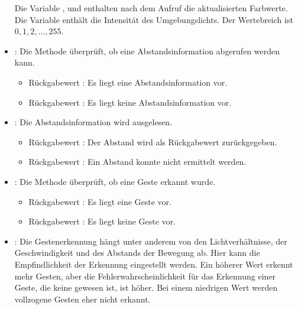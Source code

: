 \begin{itemize}


        \medskip

        Die Variable ,  und   enthalten nach dem Aufruf die aktualisierten Farbwerte. Die Variable enthält die Intensität des Umgebungslichts. Der Wertebreich ist $0, 1, 2, \ldots, 255$.
  
  \item {}: Die Methode überprüft, ob eine Abstandsinformation abgerufen werden kann.

        \medskip

        \begin{itemize}
          \item Rückgabewert : Es liegt eine Abstandsinformation vor.
          \item Rückgabewert : Es liegt keine Abstandsinformation vor.
       \end{itemize}

  \item {}: Die Abstandsinformation wird ausgelesen.
  
        \medskip

        \begin{itemize}
          \item Rückgabewert : Der Abstand wird als Rückgabewert zurückgegeben.
          \item Rückgabewert : Ein Abstand konnte nicht ermittelt werden.
       \end{itemize}
   
  \item {}: Die Methode überprüft, ob eine Geste erkannt wurde.

        \medskip

        \begin{itemize}
          \item Rückgabewert : Es liegt eine Geste vor.
          \item Rückgabewert : Es liegt keine Geste vor.
       \end{itemize}

  \item {}: Die Gestenerkennung hängt unter anderem von den Lichtverhältnisse, der Geschwindigkeit und des Abstands der Bewegung ab. Hier kann die Empfindlichkeit der Erkennung eingestellt werden. Ein höherer Wert erkennt mehr Gesten, aber die Fehlerwahrscheinlichkeit für das Erkennung einer Geste, die keine gewesen ist, ist höher. Bei einem niedrigen Wert werden vollzogene Gesten eher nicht erkannt. 
  

\end{itemize}
